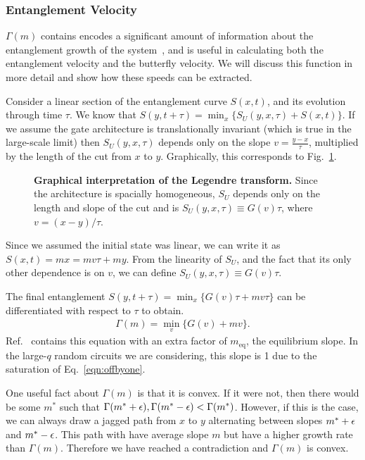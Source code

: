 \subsubsection{Entanglement Velocity} \label{subsub:v_E }

$\Gamma(m)$ contains encodes a significant amount of information about the entanglement growth of the system~\cite{Jonay18}, and is useful in calculating both the entanglement velocity and the butterfly velocity. We will discuss this function in more detail and show how these speeds can be extracted.

Consider a linear section of the entanglement curve $S(x,t)$, and its evolution through time $\tau$. We know that $S(y,t+\tau) = \min_x\{S_U(y,x,\tau) + S(x,t)\}$. If we assume the gate architecture is translationally invariant (which is true in the large-scale limit) then $S_U(y,x,\tau)$ depends only on the slope $v = \frac{y-x}{\tau}$, multiplied by the length of the cut from $x$ to $y$. Graphically, this corresponds to Fig.~\ref{fig:legendre}.
\begin{figure}
	\centering
	
	\caption{\textbf{Graphical interpretation of the Legendre transform.} Since the architecture is spacially homogeneous, $S_U$ depends only on the length and slope of the cut and is $S_U(y,x,\tau) \equiv G(v)\tau$, where $v=(x-y)/\tau$.}
	\label{fig:legendre}
\end{figure}
Since we assumed the initial state was linear, we can write it as $S(x,t) = mx = mv\tau+my$. From the linearity of $S_U$, and the fact that its only other dependence is on $v$, we can define $S_U(y,x,\tau) \equiv G(v)\tau$. 

The final entanglement $S(y,t+\tau) = \min_x\{G(v)\tau + mv\tau\}$ can be differentiated with respect to $\tau$ to obtain.
\begin{align}
\Gamma(m) = \min_v\{G(v) + mv\}.
\end{align}
Ref.~\cite{Jonay18} contains this equation with an extra factor of $m_\text{eq}$, the equilibrium slope. In the large-$q$ random circuits we are considering, this slope is 1 due to the saturation of Eq.~\ref{eqn:offbyone}.

One useful fact about $\Gamma(m)$ is that it is convex. If it were not, then there would be some $m^*$ such that $\Gamma(m^*+\epsilon), \Gamma(m^*-\epsilon)<\Gamma(m^*)$. However, if this is the case, we can always draw a jagged path from $x$ to $y$ alternating between slopes $m^*+\epsilon$ and $m^*-\epsilon$. This path with have average slope $m$ but have a higher growth rate than $\Gamma(m)$. Therefore we have reached a contradiction and $\Gamma(m)$ is convex.


